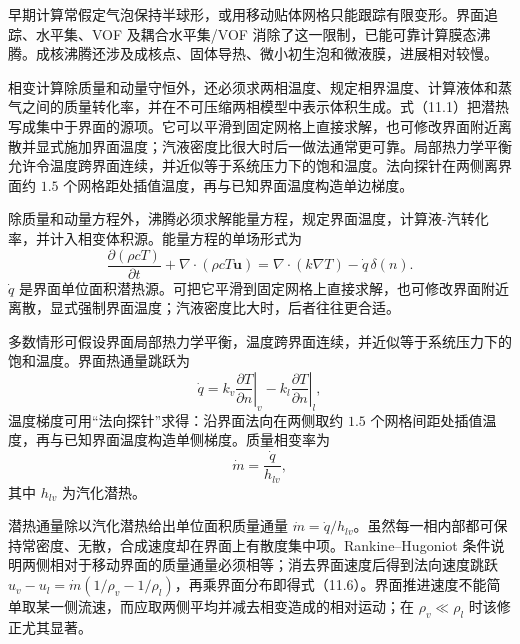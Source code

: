 \documentclass[11pt,a4paper,openany,fontset=none]{ctexbook}
\begin{document}
早期计算常假定气泡保持半球形，或用移动贴体网格只能跟踪有限变形。界面追踪、水平集、VOF 及耦合水平集/VOF 消除了这一限制，已能可靠计算膜态沸腾。成核沸腾还涉及成核点、固体导热、微小初生泡和微液膜，进展相对较慢。

相变计算除质量和动量守恒外，还必须求两相温度、规定相界温度、计算液体和蒸气之间的质量转化率，并在不可压缩两相模型中表示体积生成。式（11.1）把潜热写成集中于界面的源项。它可以平滑到固定网格上直接求解，也可修改界面附近离散并显式施加界面温度；汽液密度比很大时后一做法通常更可靠。局部热力学平衡允许令温度跨界面连续，并近似等于系统压力下的饱和温度。法向探针在两侧离界面约 $1.5$ 个网格距处插值温度，再与已知界面温度构造单边梯度。

除质量和动量方程外，沸腾必须求解能量方程，规定界面温度，计算液-汽转化率，并计入相变体积源。能量方程的单场形式为
\begin{equation}
 \frac{\partial(\rho cT)}{\partial t}+\nabla\cdot(\rho cT\bm u)
 =\nabla\cdot(k\nabla T)-\dot q\,\delta(n). \tag{11.1}
\end{equation}
$\dot q$ 是界面单位面积潜热源。可把它平滑到固定网格上直接求解，也可修改界面附近离散，显式强制界面温度；汽液密度比大时，后者往往更合适。

多数情形可假设界面局部热力学平衡，温度跨界面连续，并近似等于系统压力下的饱和温度。界面热通量跳跃为
\begin{equation}
 \dot q=\left.k_v\frac{\partial T}{\partial n}\right|_v
 -\left.k_l\frac{\partial T}{\partial n}\right|_l, \tag{11.2}
\end{equation}
温度梯度可用“法向探针”求得：沿界面法向在两侧取约 $1.5$ 个网格间距处插值温度，再与已知界面温度构造单侧梯度。质量相变率为
\begin{equation*}
 \dot m=\frac{\dot q}{h_{lv}},
\end{equation*}
其中 $h_{lv}$ 为汽化潜热。

潜热通量除以汽化潜热给出单位面积质量通量 $\dot m=\dot q/h_{lv}$。虽然每一相内部都可保持常密度、无散，合成速度却在界面上有散度集中项。Rankine--Hugoniot 条件说明两侧相对于移动界面的质量通量必须相等；消去界面速度后得到法向速度跳跃 $u_v-u_l=\dot m(1/\rho_v-1/\rho_l)$，再乘界面分布即得式（11.6）。界面推进速度不能简单取某一侧流速，而应取两侧平均并减去相变造成的相对运动；在 $\rho_v\ll\rho_l$ 时该修正尤其显著。
\end{document}
